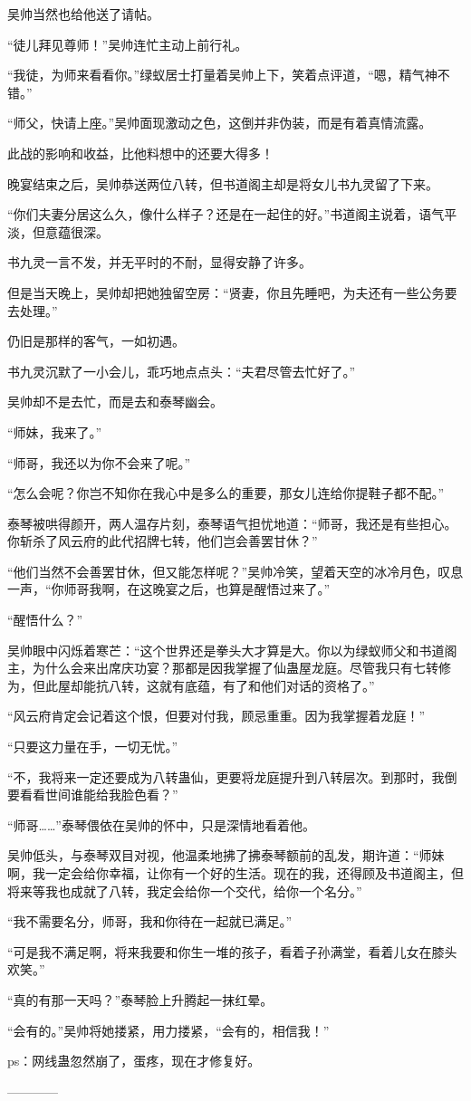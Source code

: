 \begin{this_body}
吴帅当然也给他送了请帖。

“徒儿拜见尊师！”吴帅连忙主动上前行礼。

“我徒，为师来看看你。”绿蚁居士打量着吴帅上下，笑着点评道，“嗯，精气神不错。”

“师父，快请上座。”吴帅面现激动之色，这倒并非伪装，而是有着真情流露。

此战的影响和收益，比他料想中的还要大得多！

晚宴结束之后，吴帅恭送两位八转，但书道阁主却是将女儿书九灵留了下来。

“你们夫妻分居这么久，像什么样子？还是在一起住的好。”书道阁主说着，语气平淡，但意蕴很深。

书九灵一言不发，并无平时的不耐，显得安静了许多。

但是当天晚上，吴帅却把她独留空房：“贤妻，你且先睡吧，为夫还有一些公务要去处理。”

仍旧是那样的客气，一如初遇。

书九灵沉默了一小会儿，乖巧地点点头：“夫君尽管去忙好了。”

吴帅却不是去忙，而是去和泰琴幽会。

“师妹，我来了。”

“师哥，我还以为你不会来了呢。”

“怎么会呢？你岂不知你在我心中是多么的重要，那女儿连给你提鞋子都不配。”

泰琴被哄得颜开，两人温存片刻，泰琴语气担忧地道：“师哥，我还是有些担心。你斩杀了风云府的此代招牌七转，他们岂会善罢甘休？”

“他们当然不会善罢甘休，但又能怎样呢？”吴帅冷笑，望着天空的冰冷月色，叹息一声，“你师哥我啊，在这晚宴之后，也算是醒悟过来了。”

“醒悟什么？”

吴帅眼中闪烁着寒芒：“这个世界还是拳头大才算是大。你以为绿蚁师父和书道阁主，为什么会来出席庆功宴？那都是因我掌握了仙蛊屋龙庭。尽管我只有七转修为，但此屋却能抗八转，这就有底蕴，有了和他们对话的资格了。”

“风云府肯定会记着这个恨，但要对付我，顾忌重重。因为我掌握着龙庭！”

“只要这力量在手，一切无忧。”

“不，我将来一定还要成为八转蛊仙，更要将龙庭提升到八转层次。到那时，我倒要看看世间谁能给我脸色看？”

“师哥……”泰琴偎依在吴帅的怀中，只是深情地看着他。

吴帅低头，与泰琴双目对视，他温柔地拂了拂泰琴额前的乱发，期许道：“师妹啊，我一定会给你幸福，让你有一个好的生活。现在的我，还得顾及书道阁主，但将来等我也成就了八转，我定会给你一个交代，给你一个名分。”

“我不需要名分，师哥，我和你待在一起就已满足。”

“可是我不满足啊，将来我要和你生一堆的孩子，看着子孙满堂，看着儿女在膝头欢笑。”

“真的有那一天吗？”泰琴脸上升腾起一抹红晕。

“会有的。”吴帅将她搂紧，用力搂紧，“会有的，相信我！”

ps：网线蛊忽然崩了，蛋疼，现在才修复好。

------------

\end{this_body}

